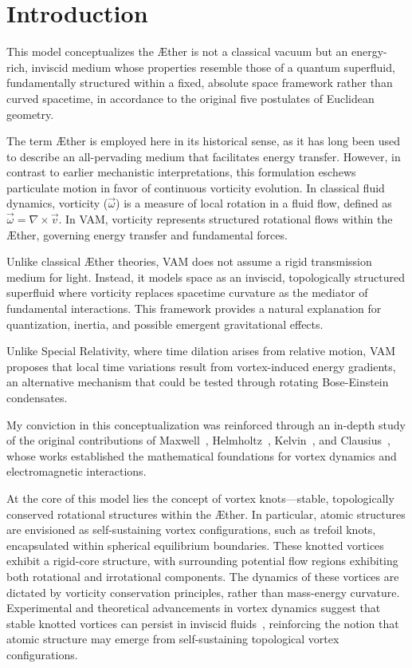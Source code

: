 
\section*{Introduction}
This model conceptualizes the Æther is not a classical vacuum but an energy-rich, inviscid medium whose properties resemble those of a quantum superfluid, fundamentally structured within a fixed, absolute space framework rather than curved spacetime, in accordance to the original five postulates of Euclidean geometry.


The term \AE ther is employed here in its historical sense, as it has long been used to describe an all-pervading medium that facilitates energy transfer.
However, in contrast to earlier mechanistic interpretations, this formulation eschews particulate motion in favor of continuous vorticity evolution. In classical fluid dynamics, vorticity ($\vec{\omega}$) is a measure of local rotation in a fluid flow, defined as $\vec{\omega} = \nabla \times \vec{v}$. In VAM, vorticity represents structured rotational flows within the Æther, governing energy transfer and fundamental forces.

Unlike classical Æther theories, VAM does not assume a rigid transmission medium for light. Instead, it models space as an inviscid, topologically structured superfluid where vorticity replaces spacetime curvature as the mediator of fundamental interactions. This framework provides a natural explanation for quantization, inertia, and possible emergent gravitational effects.

Unlike Special Relativity, where time dilation arises from relative motion, VAM proposes that local time variations result from vortex-induced energy gradients, an alternative mechanism that could be tested through rotating Bose-Einstein condensates.



My conviction in this conceptualization was reinforced through an in-depth study of the original contributions of Maxwell~\cite{maxwell1861}, Helmholtz~\cite{helmholtz1858}, Kelvin~\cite{kelvin1867}, and Clausius~\cite{clausius1865}, whose works established the mathematical foundations for vortex dynamics and electromagnetic interactions.

At the core of this model lies the concept of vortex knots—stable, topologically conserved rotational structures within the \AE ther.
In particular, atomic structures are envisioned as self-sustaining vortex configurations, such as trefoil knots, encapsulated within spherical equilibrium boundaries.
These knotted vortices exhibit a rigid-core structure, with surrounding potential flow regions exhibiting both rotational and irrotational components.
The dynamics of these vortices are dictated by vorticity conservation principles, rather than mass-energy curvature.
Experimental and theoretical advancements in vortex dynamics suggest that stable knotted vortices can persist in inviscid fluids~\cite{kleckner2013}, reinforcing the notion that atomic structure may emerge from self-sustaining topological vortex configurations.

